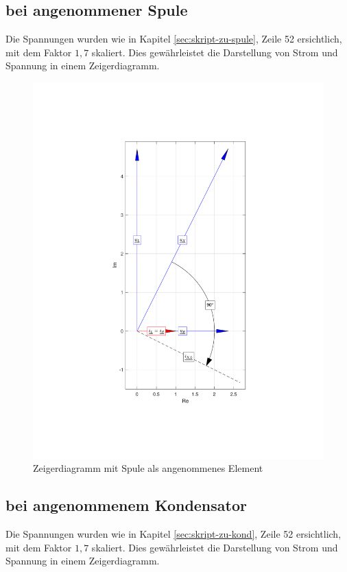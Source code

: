 \documentclass[11pt]{scrartcl}
\begin{document}
\subsection{bei angenommener Spule}
\label{sec:bei-angen-spule}
Die Spannungen wurden wie in Kapitel \ref{sec:skript-zu-spule}, Zeile 52 ersichtlich, mit dem Faktor $1,7$ skaliert. Dies gewährleistet die Darstellung von Strom und Spannung in einem Zeigerdiagramm.

\begin{figure}[!htb]
    \begin{center}
      \includegraphics[width=0.45\linewidth]{./Assets/1_L.pdf}
    \caption{Zeigerdiagramm mit Spule als angenommenes Element}
    \label{fig:diagramm-spule}
  \end{center}
\end{figure}


\newpage
\subsection{bei angenommenem Kondensator}
\label{sec:bei-angen-kond}

Die Spannungen wurden wie in Kapitel \ref{sec:skript-zu-kond}, Zeile 52 ersichtlich, mit dem Faktor $1,7$ skaliert. Dies gewährleistet die Darstellung von Strom und Spannung in einem Zeigerdiagramm.
\end{document}
